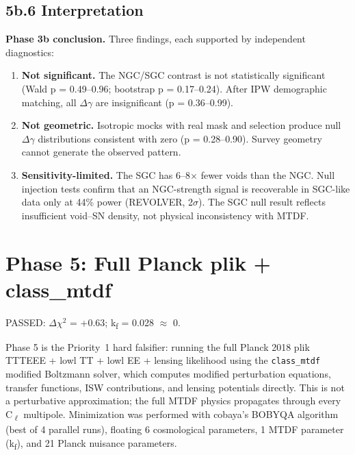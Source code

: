 \documentclass[11pt,a4paper]{article}
\begin{document}
\subsection{5b.6 Interpretation}
\begin{mdframed}[linecolor=accent,linewidth=0.5pt,backgroundcolor=callout-bg,leftline=true,rightline=true,topline=true,bottomline=true,innerleftmargin=8pt,innerrightmargin=8pt,innertopmargin=6pt,innerbottommargin=6pt]
\textbf{Phase 3b conclusion.}
Three findings, each supported by independent diagnostics:
\begin{enumerate}
  \item \textbf{Not significant.} The NGC/\allowbreak{}SGC contrast is not statistically significant (Wald p = 0.49--0.96; bootstrap p = 0.17--0.24). After IPW demographic matching, all $\Delta$$\gamma$ are insignificant (p = 0.36--0.99).
  \item \textbf{Not geometric.} Isotropic mocks with real mask and selection produce null $\Delta$$\gamma$ distributions consistent with zero (p = 0.28--0.90). Survey geometry cannot generate the observed pattern.
  \item \textbf{Sensitivity-limited.} The SGC has 6--8$\times$ fewer voids than the NGC. Null injection tests confirm that an NGC-strength signal is recoverable in SGC-like data only at 44\% power (REVOLVER, 2$\sigma$). The SGC null result reflects insufficient void--SN density, not physical inconsistency with MTDF.
\end{enumerate}
\end{mdframed}

\section{Phase 5: Full Planck plik + class\_\allowbreak{}mtdf}
\label{sec:sec6}
PASSED: $\Delta$$\chi$$^{2}$ = +0.63; k\textsubscript{f} = 0.028 $\approx$ 0.

Phase 5 is the Priority~1 hard falsifier: running the full Planck 2018 plik TTTEEE + lowl TT + lowl EE + lensing likelihood using the \texttt{class\_\allowbreak{}mtdf} modified Boltzmann solver, which computes modified perturbation equations, transfer functions, ISW contributions, and lensing potentials directly. This is not a perturbative approximation; the full MTDF physics propagates through every C\textsubscript{$\ell$} multipole. Minimization was performed with cobaya's BOBYQA algorithm (best of 4 parallel runs), floating 6 cosmological parameters, 1 MTDF parameter (k\textsubscript{f}), and 21 Planck nuisance parameters.
\end{document}
